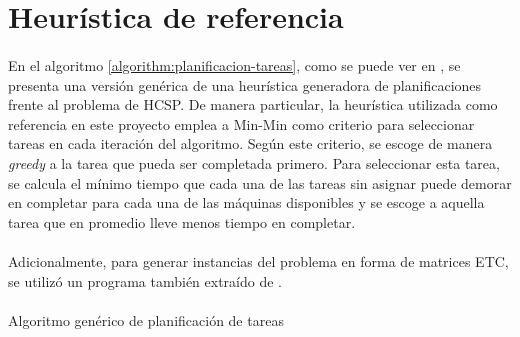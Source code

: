  \section{Heurística de referencia} \label{section:descripcion-problema,subsection:heuristica}
 
\paragraph{}En el algoritmo \ref{algorithm:planificacion-tareas}, como se puede ver en \citet{bib-doctorado-nesmachnow}, se presenta una versión genérica de una heurística generadora de planificaciones frente al problema de HCSP. De manera particular, la heurística utilizada como referencia en este proyecto emplea a Min-Min como criterio para seleccionar tareas en cada iteración del algoritmo. Según este criterio, se escoge de manera \textit{greedy} a la tarea que pueda ser completada primero. Para seleccionar esta tarea, se calcula el mínimo tiempo que cada una de las tareas sin asignar puede demorar en completar para cada una de las máquinas disponibles y se escoge a aquella tarea que en promedio lleve menos tiempo en completar.

\paragraph{}Adicionalmente, para generar instancias del problema en forma de matrices ETC, se utilizó un programa también extraído de \citet{bib-doctorado-nesmachnow}.
 
 
 \paragraph{}
 \SetEndCharOfAlgoLine{}
 \begin{algorithm}[H]
\SetAlgoLined
{}
 \caption{Algoritmo genérico de planificación de tareas} \label{algorithm:planificacion-tareas}
\end{algorithm}
